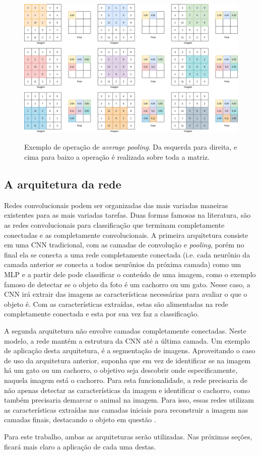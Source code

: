 \begin{figure}[H]
    \centering
    \caption{Exemplo de operação de \textit{average pooling}. Da esquerda para direita, e cima para baixo a operação é realizada sobre toda a matriz.}
    \includegraphics[width=13cm]{fig/Avg Pooling.png}
    \label{fig:fig6}
\end{figure}

\subsection{A arquitetura da rede}

Redes convolucionais podem ser organizadas das mais variadas maneiras existentes para as mais variadas tarefas. Duas formas famosas na literatura, são as redes convolucionais para classificação que terminam completamente conectadas e as completamente convolucionais. A primeira arquitetura consiste em uma CNN tradicional, com as camadas de convolução e \textit{pooling}, porém no final ela se conecta a uma rede completamente conectada (i.e. cada neurônio da camada anterior se conecta a todos neurônios da próxima camada) como um MLP e a partir dele pode classificar o conteúdo de uma imagem, como o exemplo famoso de detectar se o objeto da foto é um cachorro ou um gato. Nesse caso, a CNN irá extrair das imagens as características necessárias para avaliar o que o objeto é. Com as características extraídas, estas são alimentadas na rede completamente conectada e esta por sua vez faz a classificação.

A segunda arquitetura não envolve camadas completamente conectadas. Neste modelo, a rede mantém a estrutura da CNN até a última camada. Um exemplo de aplicação desta arquitetura, é a segmentação de imagens. Aproveitando o caso de uso da arquitetura anterior, suponha que em vez de identificar se na imagem há um gato ou um cachorro, o objetivo seja descobrir onde especificamente, naquela imagem está o cachorro. Para esta funcionalidade, a rede precisaria de não apenas detectar as características da imagem e identificar o cachorro, como também precisaria demarcar o animal na imagem. Para isso, essas redes utilizam as características extraídas nas camadas iniciais para reconstruir a imagem nas camadas finais, destacando o objeto em questão \cite{kumar_semantic_2020}.

Para este trabalho, ambas as arquiteturas serão utilizadas. Nas próximas seções, ficará mais claro a aplicação de cada uma destas.
